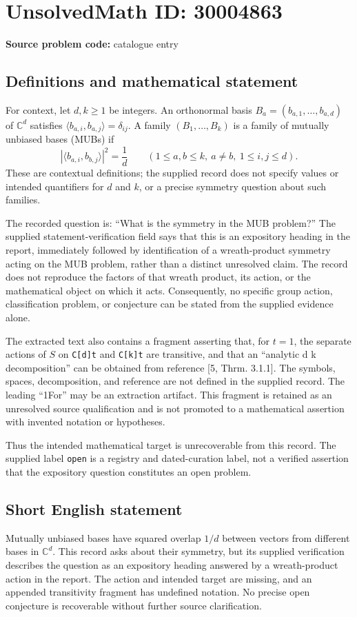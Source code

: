 \documentclass[11pt]{article}
\newcommand{\C}{\mathbb{C}}
\begin{document}
\section*{UnsolvedMath ID: 30004863}
\textbf{Source problem code:} catalogue entry
\subsection{Definitions and mathematical statement}
For context, let \(d,k\geq 1\) be integers. An orthonormal basis \(B_a=(b_{a,1},\ldots,b_{a,d})\) of \(\C^d\) satisfies \(\langle b_{a,i},b_{a,j}\rangle=\delta_{ij}\). A family \((B_1,\ldots,B_k)\) is a family of mutually unbiased bases (MUBs) if
\[
  |\langle b_{a,i},b_{b,j}\rangle|^2=\frac{1}{d}
  \qquad
  (1\leq a,b\leq k,\ a\neq b,\ 1\leq i,j\leq d).
\]
These are contextual definitions; the supplied record does not specify values or intended quantifiers for \(d\) and \(k\), or a precise symmetry question about such families.

The recorded question is: ``What is the symmetry in the MUB problem?'' The supplied statement-verification field says that this is an expository heading in the report, immediately followed by identification of a wreath-product symmetry acting on the MUB problem, rather than a distinct unresolved claim. The record does not reproduce the factors of that wreath product, its action, or the mathematical object on which it acts. Consequently, no specific group action, classification problem, or conjecture can be stated from the supplied evidence alone.

The extracted text also contains a fragment asserting that, for \(t=1\), the separate actions of \(S\) on \texttt{C[d]t} and \texttt{C[k]t} are transitive, and that an ``analytic d k decomposition'' can be obtained from reference [5, Thrm. 3.1.1]. The symbols, spaces, decomposition, and reference are not defined in the supplied record. The leading ``1For'' may be an extraction artifact. This fragment is retained as an unresolved source qualification and is not promoted to a mathematical assertion with invented notation or hypotheses.

Thus the intended mathematical target is unrecoverable from this record. The supplied label \texttt{open} is a registry and dated-curation label, not a verified assertion that the expository question constitutes an open problem.
\subsection{Short English statement}
Mutually unbiased bases have squared overlap \(1/d\) between vectors from different bases in \(\C^d\). This record asks about their symmetry, but its supplied verification describes the question as an expository heading answered by a wreath-product action in the report. The action and intended target are missing, and an appended transitivity fragment has undefined notation. No precise open conjecture is recoverable without further source clarification.
\end{document}
